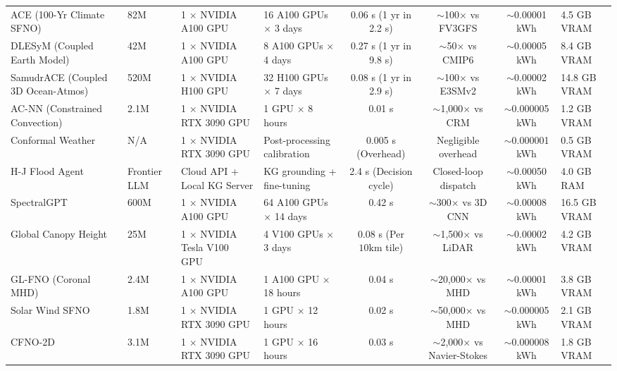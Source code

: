 \begin{table}[t]
{\begin{tabular}{@{}llp{2.6cm}p{3.2cm}cccp{2.6cm}@{}}
ACE (100-Yr Climate SFNO)~\cite{wattmeyer2024ace} & 82M & 1 $\times$ NVIDIA A100 GPU & 16 A100 GPUs $\times$ 3 days & 0.06 s (1 yr in 2.2 s) & $\sim$100$\times$ vs FV3GFS & $\sim$0.00001 kWh & 4.5 GB VRAM \\
DLESyM (Coupled Earth Model)~\cite{cresswellclay2024dlesym} & 42M & 1 $\times$ NVIDIA A100 GPU & 8 A100 GPUs $\times$ 4 days & 0.27 s (1 yr in 9.8 s) & $\sim$50$\times$ vs CMIP6 & $\sim$0.00005 kWh & 8.4 GB VRAM \\
SamudrACE (Coupled 3D Ocean-Atmos)~\cite{duncan2025samudrace} & 520M & 1 $\times$ NVIDIA H100 GPU & 32 H100 GPUs $\times$ 7 days & 0.08 s (1 yr in 2.9 s) & $\sim$100$\times$ vs E3SMv2 & $\sim$0.00002 kWh & 14.8 GB VRAM \\
AC-NN (Constrained Convection)~\cite{beucler2021enforcing} & 2.1M & 1 $\times$ NVIDIA RTX 3090 GPU & 1 GPU $\times$ 8 hours & 0.01 s & $\sim$1,000$\times$ vs CRM & $\sim$0.000005 kWh & 1.2 GB VRAM \\
Conformal Weather~\cite{gopakumar2024conformal} & N/A & 1 $\times$ NVIDIA RTX 3090 GPU & Post-processing calibration & 0.005 s (Overhead) & Negligible overhead & $\sim$0.000001 kWh & 0.5 GB VRAM \\
H-J Flood Agent~\cite{ji2025entropy} & Frontier LLM & Cloud API + Local KG Server & KG grounding + fine-tuning & 2.4 s (Decision cycle) & Closed-loop dispatch & $\sim$0.00050 kWh & 4.0 GB RAM \\
SpectralGPT~\cite{hong2024spectralgpt} & 600M & 1 $\times$ NVIDIA A100 GPU & 64 A100 GPUs $\times$ 14 days & 0.42 s & $\sim$300$\times$ vs 3D CNN & $\sim$0.00008 kWh & 16.5 GB VRAM \\
Global Canopy Height~\cite{lang2023canopy} & 25M & 1 $\times$ NVIDIA Tesla V100 GPU & 4 V100 GPUs $\times$ 3 days & 0.08 s (Per $10\text{km}$ tile) & $\sim$1,500$\times$ vs LiDAR & $\sim$0.00002 kWh & 4.2 GB VRAM \\
GL-FNO (Coronal MHD)~\cite{du2024glfno} & 2.4M & 1 $\times$ NVIDIA A100 GPU & 1 A100 GPU $\times$ 18 hours & 0.04 s & $\sim$20,000$\times$ vs MHD & $\sim$0.00001 kWh & 3.8 GB VRAM \\
Solar Wind SFNO~\cite{mansouri2025solarwind} & 1.8M & 1 $\times$ NVIDIA RTX 3090 GPU & 1 GPU $\times$ 12 hours & 0.02 s & $\sim$50,000$\times$ vs MHD & $\sim$0.000005 kWh & 2.1 GB VRAM \\
CFNO-2D~\cite{brandstetter2023clifford} & 3.1M & 1 $\times$ NVIDIA RTX 3090 GPU & 1 GPU $\times$ 16 hours & 0.03 s & $\sim$2,000$\times$ vs Navier-Stokes & $\sim$0.000008 kWh & 1.8 GB VRAM \\

\end{tabular}}
\end{table}
